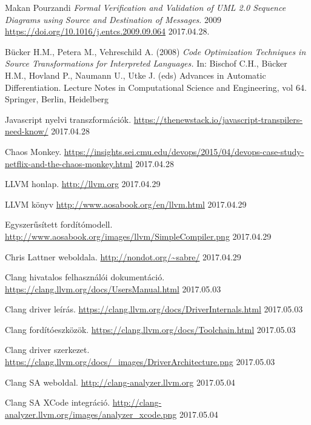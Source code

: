 \documentclass[a4paper,12pt]{report}
\begin{document}
\begin{thebibliography}{xx}

 Makan Pourzandi {\em Formal Verification and Validation of UML
2.0 Sequence Diagrams using Source and
Destination of Messages}.  2009 \url{https://doi.org/10.1016/j.entcs.2009.09.064} 2017.04.28.

 Bücker H.M., Petera M., Vehreschild A. (2008) {\em Code Optimization Techniques in Source Transformations for Interpreted Languages.} In: Bischof C.H., Bücker H.M., Hovland P., Naumann U., Utke J. (eds) Advances in Automatic Differentiation. Lecture Notes in Computational Science and Engineering, vol 64. Springer, Berlin, Heidelberg

 Javascript nyelvi transzformációk. \url{https://thenewstack.io/javascript-transpilers-need-know/} 2017.04.28

 Chaos Monkey. \url{https://insights.sei.cmu.edu/devops/2015/04/devops-case-study-netflix-and-the-chaos-monkey.html} 2017.04.28

 LLVM honlap. \url{http://llvm.org} 2017.04.29

 LLVM könyv \url{http://www.aosabook.org/en/llvm.html} 2017.04.29

 Egyszerűsített fordítómodell. \url{http://www.aosabook.org/images/llvm/SimpleCompiler.png} 2017.04.29

 Chris Lattner weboldala. \url{http://nondot.org/~sabre/} 2017.04.29

 Clang hivatalos felhasználói dokumentáció. \url{https://clang.llvm.org/docs/UsersManual.html} 2017.05.03

 Clang driver leírás. \url{https://clang.llvm.org/docs/DriverInternals.html} 2017.05.03

 Clang fordítóeszközök. \url{https://clang.llvm.org/docs/Toolchain.html} 2017.05.03

 Clang driver szerkezet. \url{https://clang.llvm.org/docs/\_images/DriverArchitecture.png} 2017.05.03

 Clang SA weboldal. \url{http://clang-analyzer.llvm.org} 2017.05.04

 Clang SA XCode integráció. \url{http://clang-analyzer.llvm.org/images/analyzer\_xcode.png} 2017.05.04


\end{thebibliography}
\end{document}
